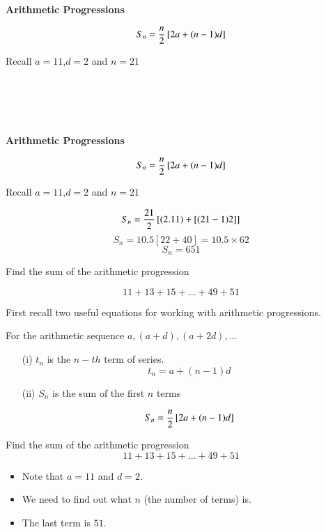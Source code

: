 \documentclass[12pt]{article}
\begin{document}


\noindent\textbf{Arithmetic Progressions}

\[ S_n  = {n \over 2} \left[ 2a+(n-1)d \right] \]

Recall $a=11$,$d=2$ and $n=21$


\[ \phantom{S_n  = {21 \over 2} \left[ (2.11) +[(21-1)2] \right]} \]
\[ \phantom{S_n  = 10.5 \left[ 22 + 40 \right]  = 10.5 \times 62}\]
\[ \phantom{S_n  = 651} \] 




\noindent\textbf{Arithmetic Progressions}

\[ S_n  = {n \over 2} \left[ 2a+(n-1)d \right] \]

Recall $a=11$,$d=2$ and $n=21$


\[ S_n  = {21 \over 2} \left[ (2.11) +[(21-1)2] \right] \]
\[ S_n  = 10.5 \left[ 22 + 40 \right]  = 10.5 \times 62\]
\[ S_n  = 651 \] 









Find the sum of the arithmetic progression
{

\[ 11 + 13 + 15 + \ldots + 49 + 51 \]
}



First recall two useful equations for working with arithmetic progressions.\\
\bigskip


For the arithmetic sequence $a,(a+d) ,(a+2d), \ldots$

\begin{itemize}
\item[(i)] $t_n$ is the $n-th$ term of series.\[ t_n= a+(n-1)d \]

\item[(ii)] $S_n$ is the sum of the first $n$ terms

\[ S_n  = {n \over 2} \left[ 2a+(n-1)d \right] \]
\end{itemize}



Find the sum of the arithmetic progression
{
\[ 11 + 13 + 15 + \dots + 49 + 51 \]
}
\begin{itemize}
\item Note that $a=11$ and $d=2$.
\item We need to find out what $n$ (the number of terms) is.
\item The last term is $51$.
\end{itemize}
\end{document}
